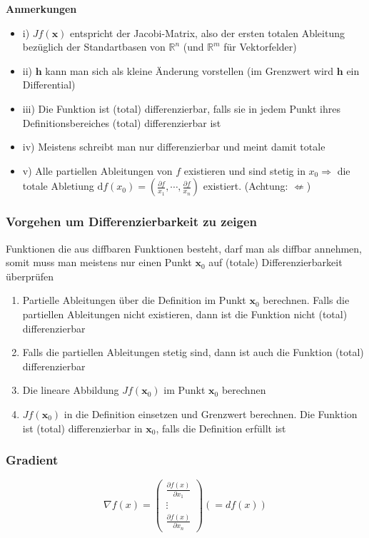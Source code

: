 \documentclass[8pt, a4paper, landscape, fleqn]{scrartcl}
\newenvironment {annotation}[1]
				{\begin{itshape} \begin{small} \textbf{#1} \begin{itemize}}
				{\end{itemize} \end{small} \end{itshape}}
\def\d{\text{d}}
\begin{document}
\begin{multicols*}{3}
					\begin{annotation}{Anmerkungen}
						\item[i)] $Jf(\textbf{x})$ entspricht der Jacobi-Matrix, also der ersten totalen Ableitung bezüglich der Standartbasen von $\mathbb{R}^n$ (und $\mathbb{R}^m$ für Vektorfelder)
						\item[ii)] $\textbf{h}$ kann man sich als kleine Änderung vorstellen (im Grenzwert wird $\textbf{h}$ ein Differential)
						\item[iii)] Die Funktion ist (total) differenzierbar, falls sie in jedem Punkt ihres Definitionsbereiches (total) differenzierbar ist
						\item[iv)] Meistens schreibt man nur differenzierbar und meint damit totale 
						\item[v)] Alle partiellen Ableitungen von $f$ existieren und sind stetig in $x_0 \Rightarrow$ die totale Abletiung $\d f(x_0) = (\frac{\partial f}{x_1}, \cdots, \frac{\partial f}{x_n})$ existiert. (Achtung: $\not\Leftarrow$)
					\end{annotation}
				\subsubsection{Vorgehen um Differenzierbarkeit zu zeigen}
					Funktionen die aus diffbaren Funktionen besteht, darf man als diffbar annehmen, somit muss man meistens nur einen Punkt $\textbf{x}_0$ auf (totale) Differenzierbarkeit überprüfen
					\begin{enumerate}
						\item Partielle Ableitungen über die Definition im Punkt $\textbf{x}_0$ berechnen. Falls die partiellen Ableitungen nicht existieren, dann ist die Funktion nicht (total) differenzierbar
						\item Falls die partiellen Ableitungen stetig sind, dann ist auch die Funktion (total) differenzierbar
						\item Die lineare Abbildung $Jf(\textbf{x}_0)$ im Punkt $\textbf{x}_0$ berechnen
						\item $Jf(\textbf{x}_0)$ in die Definition einsetzen und Grenzwert berechnen. Die Funktion ist (total) differenzierbar in $\textbf{x}_0$, falls die Definition erfüllt ist
					\end{enumerate}
				\subsubsection{Gradient}
				    \label{sec:Gradient}
					\vspace{-5pt}
					\begin{equation*}
						\nabla f(x)=
						\begin{pmatrix}
							\frac{\partial f(x)}{\partial x_1}\\
							\vdots\\
							\frac{\partial f(x)}{\partial x_n}
						\end{pmatrix} (=df(x))
					\end{equation*}

\end{multicols*}
\end{document}
